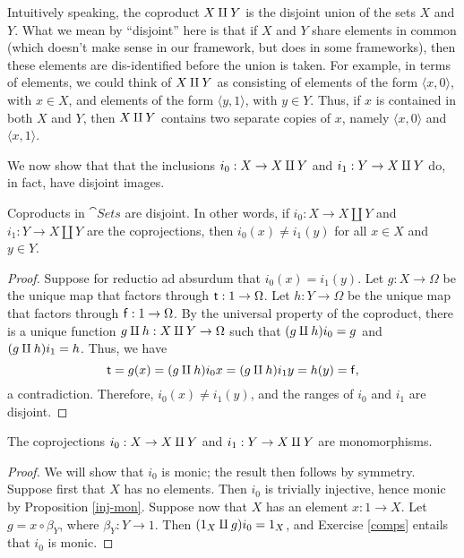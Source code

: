    Intuitively speaking, the coproduct $X\amalg Y$ is the disjoint union
   of the sets $X$ and $Y$.  What we mean by ``disjoint'' here is that
   if $X$ and $Y$ share elements in common (which doesn't make sense
   in our framework, but does in some frameworks), then these elements
   are dis-identified before the union is taken.  For example, in
   terms of elements, we could think of $X\amalg Y$ as consisting of
   elements of the form $\langle x,0\rangle$, with $x\in X$, and
   elements of the form $\langle y,1\rangle$, with $y\in Y$.  Thus, if
   $x$ is contained in both $X$ and $Y$, then $X\amalg Y$ contains two
   separate copies of $x$, namely $\langle x,0\rangle$ and $\langle
   x,1\rangle$.

   We now show that that the inclusions $i_0:X\to X\amalg Y$ and
   $i_1:Y\to X\amalg Y$ do, in fact, have disjoint images.

   \begin{prop} Coproducts in $\cat{Sets}$ are disjoint.  In other
     words, if $i_0:X\to X\amalg Y$ and $i_1:Y\to X\amalg Y$ are the
     coprojections, then $i_0(x)\neq i_1(y)$ for all $x\in X$ and
     $y\in Y$.  \label{coprod-disjoint} \end{prop}

   \begin{proof} Suppose for reductio ad absurdum that
     $i_0(x)=i_1(y)$.  Let $g:X\to \Omega$ be the unique map that
     factors through $\mathsf{t}:1\to \Omega$.  Let $h:Y\to\Omega$ be the
     unique map that factors through $\mathsf{f}:1\to\Omega$.  By the
     universal property of the coproduct, there is a unique function
     $g\amalg h:X\amalg Y\to \Omega$ such that $(g\amalg h)i_0=g$ and
     $(g\amalg h)i_1=h$.  Thus, we have
     \[ \mathsf{t}=g(x)=(g\amalg h)i_0x = (g\amalg h)i_1y=h(y)=\mathsf{f} ,\] a
     contradiction.  Therefore, $i_0(x)\neq i_1(y)$, and the ranges of
     $i_0$ and $i_1$ are disjoint. \end{proof}

\begin{prop} The coprojections $i_0:X\to X\amalg Y$ and $i_1:Y\to X\amalg
  Y$ are monomorphisms.  \label{coprod-monic} \end{prop}

\begin{proof} We will show that $i_0$ is monic; the result then
  follows by symmetry.  Suppose first that $X$ has no elements.  Then
  $i_0$ is trivially injective, hence monic by Proposition \ref{inj-mon}.
  Suppose now that $X$ has an element $x:1\to X$.  Let $g=x\circ \beta
  _Y$, where $\beta _Y:Y\to 1$.  Then $(1_X\amalg g)i_0=1_X$, and Exercise
  \ref{comps} entails that $i_0$ is monic.
\end{proof}

